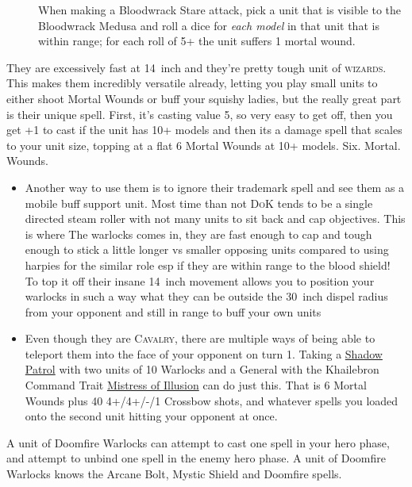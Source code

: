 \begin{description}
    \item [] When making
        a Bloodwrack Stare attack, pick a unit that is visible to the
        Bloodwrack Medusa and roll a dice for \emph{each model} in that unit
        that is within range; for each roll of 5+ the unit suffers 1 mortal
        wound.
\end{description}


They are excessively fast at 14~inch and they're pretty tough unit of
\textsc{wizards}. This makes them incredibly versatile already, letting you
play small units to either shoot Mortal Wounds or buff your squishy ladies, but
the really great part is their unique spell. First, it's casting value 5, so
very easy to get off, then you get +1 to cast if the unit has 10+ models and
then its a damage spell that scales to your unit size, topping at a flat
6 Mortal Wounds at 10+ models. Six. Mortal. Wounds. 
\begin{itemize}
    \item Another way to use them is to ignore their trademark spell and see
        them as a mobile buff support unit. Most time than not \textsc{DoK}
        tends to be a single directed steam roller with not many units to sit
        back and cap objectives. This is where The warlocks comes in, they are
        fast enough to cap and tough enough to stick a little longer vs smaller
        opposing units compared to using harpies for the similar role esp if
        they are within range to the blood shield! To top it off their insane
        14~inch movement allows you to position your warlocks in such a way
        what they can be outside the 30~inch dispel radius from your opponent
        and still in range to buff your own units 
    \item Even though they are \textsc{Cavalry}, there are multiple ways of
        being able to teleport them into the face of your opponent on turn 1.
        Taking a \hyperref[shadowpaths]{Shadow Patrol} with two units of 10
        Warlocks and a General with the Khailebron Command Trait
        \hyperref[mistress-of-illusion]{Mistress of Illusion} can do just this.
        That is 6 Mortal Wounds plus 40 4+/4+/-/1 Crossbow shots, and whatever
        spells you loaded onto the second unit hitting your opponent at once.
\end{itemize}
A unit of Doomfire Warlocks can attempt to cast one spell in your hero phase,
and attempt to unbind one spell in the enemy hero phase. A unit of Doomfire
Warlocks knows the Arcane Bolt, Mystic Shield and Doomfire spells.

